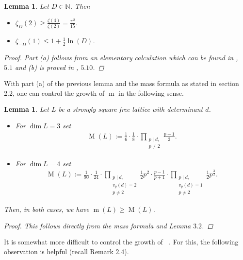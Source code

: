 \documentclass{amsart}
\newtheorem{lem}[thm]{Lemma}
\theoremstyle{definition}
\theoremstyle{remark}
\def\NN{\mathbb{N}}
\DeclareMathOperator{\m}{m}
\DeclareMathOperator{\mref}{m_{ref}}
\DeclareMathOperator{\M}{M}
\begin{document}
\begin{lem}
  Let $D \in \NN$. Then
 \begin{itemize}
  \item[(a)] $\zeta_D(2) \geq \frac{\zeta(4)}{\zeta(2)} = \frac{\pi^2}{15}$.
  \item[(b)] $\zeta_{-D}(1) \leq 1+\frac{1}{2} \ln(D)$.
 \end{itemize}
 \begin{proof} 
  Part (a) follows from an elementary calculation which can be found in \cite{kl13}, $5.1$ and (b) is proved in \cite{wat79}, $5.10$.
 \end{proof}
\end{lem}

With part (a) of the previous lemma and the mass formula as stated in section 2.2, one can control the growth of $\m$ in the following sense.

\begin{lem}
 Let $L$ be a strongly square free lattice with determinant $d$.
 \begin{itemize}
  \item[(a)]For $\dim L = 3$ set
   \begin{align*}
    \M(L):=\frac{1}{6} \cdot \frac{1}{8} \cdot \prod_{\substack{p \mid d,\\p \neq 2}} \frac{p-1}{2}.
   \end{align*}
  \item[(b)]For $\dim L = 4$ set
   \begin{align*}
    \M(L):=\frac{1}{90}\cdot \frac{1}{24} \cdot \prod_{\substack{p \mid d,\\v_p(d) = 2 \\ p \neq 2}} \frac{1}{2}p^2\cdot\frac{p-1}{p+1} 
                       \cdot \prod_{\substack{p \mid d,\\v_p(d)=1 \\ p \neq 2}}\frac{1}{2}p^{\tfrac{3}{2}}.
   \end{align*}
 \end{itemize}
Then, in both cases, we have $\m(L) \geq \M(L)$.
\begin{proof}
 This follows directly from the mass formula and Lemma $3.2$.
\end{proof}
\end{lem}


It is somewhat more difficult to control the growth of $\mref$. For this, the following observation is helpful (recall Remark $2.4$).
\end{document}
